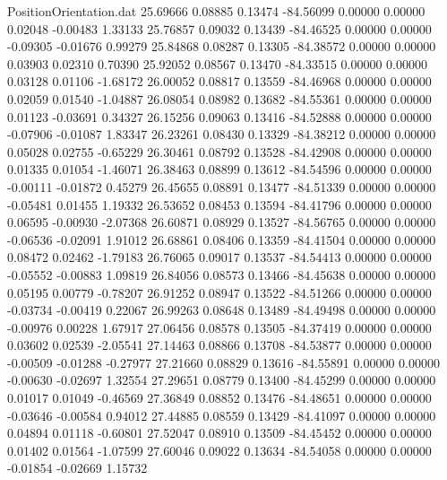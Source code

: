 \begin{filecontents}{PositionOrientation.dat}
  25.69666    0.08885    0.13474   -84.56099    0.00000    0.00000    0.02048   -0.00483    1.33133
  25.76857    0.09032    0.13439   -84.46525    0.00000    0.00000   -0.09305   -0.01676    0.99279
  25.84868    0.08287    0.13305   -84.38572    0.00000    0.00000    0.03903    0.02310    0.70390
  25.92052    0.08567    0.13470   -84.33515    0.00000    0.00000    0.03128    0.01106   -1.68172
  26.00052    0.08817    0.13559   -84.46968    0.00000    0.00000    0.02059    0.01540   -1.04887
  26.08054    0.08982    0.13682   -84.55361    0.00000    0.00000    0.01123   -0.03691    0.34327
  26.15256    0.09063    0.13416   -84.52888    0.00000    0.00000   -0.07906   -0.01087    1.83347
  26.23261    0.08430    0.13329   -84.38212    0.00000    0.00000    0.05028    0.02755   -0.65229
  26.30461    0.08792    0.13528   -84.42908    0.00000    0.00000    0.01335    0.01054   -1.46071
  26.38463    0.08899    0.13612   -84.54596    0.00000    0.00000   -0.00111   -0.01872    0.45279
  26.45655    0.08891    0.13477   -84.51339    0.00000    0.00000   -0.05481    0.01455    1.19332
  26.53652    0.08453    0.13594   -84.41796    0.00000    0.00000    0.06595   -0.00930   -2.07368
  26.60871    0.08929    0.13527   -84.56765    0.00000    0.00000   -0.06536   -0.02091    1.91012
  26.68861    0.08406    0.13359   -84.41504    0.00000    0.00000    0.08472    0.02462   -1.79183
  26.76065    0.09017    0.13537   -84.54413    0.00000    0.00000   -0.05552   -0.00883    1.09819
  26.84056    0.08573    0.13466   -84.45638    0.00000    0.00000    0.05195    0.00779   -0.78207
  26.91252    0.08947    0.13522   -84.51266    0.00000    0.00000   -0.03734   -0.00419    0.22067
  26.99263    0.08648    0.13489   -84.49498    0.00000    0.00000   -0.00976    0.00228    1.67917
  27.06456    0.08578    0.13505   -84.37419    0.00000    0.00000    0.03602    0.02539   -2.05541
  27.14463    0.08866    0.13708   -84.53877    0.00000    0.00000   -0.00509   -0.01288   -0.27977
  27.21660    0.08829    0.13616   -84.55891    0.00000    0.00000   -0.00630   -0.02697    1.32554
  27.29651    0.08779    0.13400   -84.45299    0.00000    0.00000    0.01017    0.01049   -0.46569
  27.36849    0.08852    0.13476   -84.48651    0.00000    0.00000   -0.03646   -0.00584    0.94012
  27.44885    0.08559    0.13429   -84.41097    0.00000    0.00000    0.04894    0.01118   -0.60801
  27.52047    0.08910    0.13509   -84.45452    0.00000    0.00000    0.01402    0.01564   -1.07599
  27.60046    0.09022    0.13634   -84.54058    0.00000    0.00000   -0.01854   -0.02669    1.15732

\end{filecontents}
